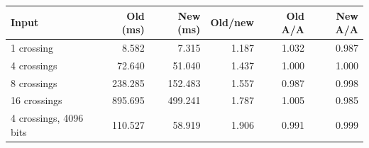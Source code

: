 \begin{tabular}{lrrrrr}
\toprule
Input & Old (ms) & New (ms) & Old/new & Old A/A & New A/A \\
\midrule
1 crossing & 8.582 & 7.315 & 1.187 & 1.032 & 0.987 \\
4 crossings & 72.640 & 51.040 & 1.437 & 1.000 & 1.000 \\
8 crossings & 238.285 & 152.483 & 1.557 & 0.987 & 0.998 \\
16 crossings & 895.695 & 499.241 & 1.787 & 1.005 & 0.985 \\
4 crossings, 4096 bits & 110.527 & 58.919 & 1.906 & 0.991 & 0.999 \\
\bottomrule
\end{tabular}
